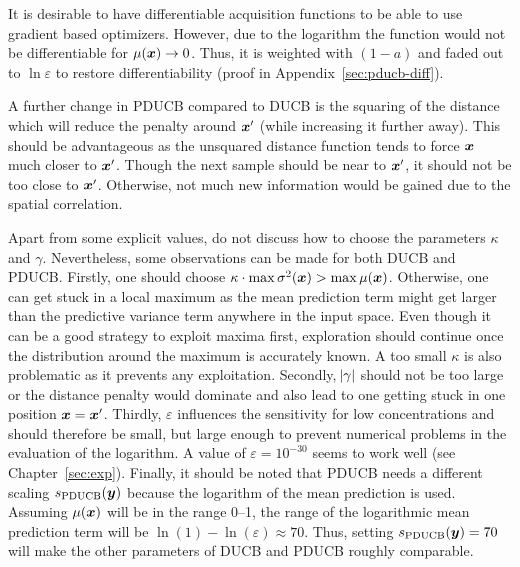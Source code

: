 It is desirable to have differentiable acquisition functions to be able to use 
gradient based optimizers. However, due to the logarithm the function would not 
be differentiable for $\mu(\bm{x}) \rightarrow 0$. Thus, it is weighted with $(1 
- a)$ and faded out to $\ln \varepsilon$ to restore differentiability (proof in 
Appendix~\ref{sec:pducb-diff}).

A further change in PDUCB compared to DUCB is the squaring of the distance which 
will reduce the penalty around $\bm{x}'$ (while increasing it further away).  
This should be advantageous as the unsquared distance function tends to force 
$\bm{x}$ much closer to $\bm{x}'$. Though the next sample should be near to $\bm{x}'$, it should not be too close to $\bm{x}'$.  Otherwise, not much new 
information would be gained due to the spatial correlation.

Apart from some explicit values, \textcite{Marchant:2012wb} do not discuss how 
to choose the parameters $\kappa$ and $\gamma$. Nevertheless, some observations 
can be made for both DUCB and PDUCB\@. Firstly, one should choose $\kappa \cdot 
\max \sigma^2(\bm{x}) > \max \mu(\bm{x})$. Otherwise, one can get stuck in a local 
maximum as the mean prediction term might get larger than the predictive 
variance term anywhere in the input space. Even though it can be a good strategy 
to exploit maxima first, exploration should continue once the distribution 
around the maximum is accurately known. A too small $\kappa$ is also problematic 
as it prevents any exploitation. Secondly, $\abs{\gamma}$ should not be too 
large or the distance penalty would dominate and also lead to one getting stuck 
in one position $\bm{x} = \bm{x}'$. Thirdly, $\varepsilon$ influences the 
sensitivity for low concentrations and should therefore be small, but large 
enough to prevent numerical problems in the evaluation of the logarithm. A value 
of $\varepsilon = 10^{-30}$ seems to work well (see Chapter~\ref{sec:exp}). 
Finally, it should be noted that PDUCB needs a different scaling 
$s_{\mathrm{PDUCB}}(\bm{y})$ because the logarithm of the mean prediction is used. 
Assuming $\mu(\bm{x})$ will be in the range \numrange{0}{1}, the range of the 
logarithmic mean prediction term will be $\ln(1) - \ln(\varepsilon) \approx 70$. 
Thus, setting $s_{\mathrm{PDUCB}}(\bm{y}) = 70$ will make the other parameters of DUCB 
and PDUCB roughly comparable.

